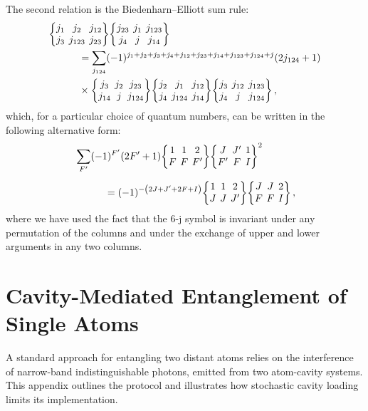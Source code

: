 \documentclass[../Thesis-IJspeert.tex]{subfiles}
\begin{document}
The second relation is the Biedenharn–Elliott sum rule:
\begin{align}
\begin{split}
&\tj{j_1}{j_2}{j_{12}}{j_3}{j_{123}}{j_{23}}\tj{j_{23}}{j_1}{j_{123}}{j_4}{j}{j_{14}}\\ &\hspace{3em}=\sum_{j_{124}}(-1)^{j_1+j_2+j_3+j_4+j_{12}+j_{23}+j_{14}+j_{123}+j_{124}+j}\left(2 j_{124}+1\right) \\
&\hspace{3em}\times\tj{j_3}{j_2}{j_{23}}{j_{14}}{j}{j_{124}} \tj{j_2}{j_1}{j_{12}}{j_4}{j_{124}}{j_{14}} \tj{j_3}{j_{12}}{j_{123}}{j_4}{j}{j_{124}}\,,
\end{split}
\end{align}
which, for a particular choice of quantum numbers, can be written in the following alternative form:
\begin{align}
\label{elliottrule}
\begin{split}
& \sum_{F'}(-1)^{F'}\left(2 F'+1\right)\tj{1}{1}{2}{F}{F}{F'}\tj{J}{J'}{1}{F'}{F}{I}^2\\[0.5em]
&\hspace{3em}=(-1)^{-\left(2 J+J'+2 F+I\right)}\tj{1}{1}{2}{J}{J}{J'}\tj{J}{J}{2}{F}{F}{I}\,,
\end{split}
\end{align}
where we have used the fact that the 6-j symbol is invariant under any permutation of the columns and under the exchange of upper and lower arguments in any two columns.

\chapter[Cavity-Mediated Entanglement of Single Atoms]{Cavity-Mediated Entanglement of\\Single Atoms}
\label{CavityMediatedEntanglement}
A standard approach for entangling two distant atoms relies on the interference of narrow-band indistinguishable photons, emitted from two atom-cavity systems. This appendix outlines the protocol and illustrates how stochastic cavity loading limits its implementation.
\end{document}
